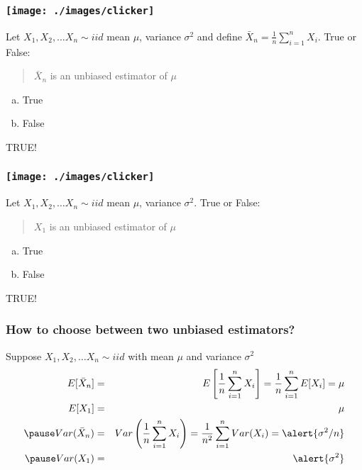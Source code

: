 \documentclass[handout]{beamer}
\begin{document}
\begin{frame}
\frametitle{\texttt{[image: ./images/clicker]}}
Let $X_1, X_2, \hdots X_n \sim iid$ mean $\mu$, variance $\sigma^2$ and define $\bar{X}_n = \frac{1}{n}\sum_{i=1}^n X_i$. True or False:

\vspace{1em}
\begin{quotation}
$\bar{X}_n$ is an unbiased estimator of $\mu$
\end{quotation}

\begin{enumerate}[(a)]
\item True
\item False
\end{enumerate}
\pause

\alert{TRUE!}

\end{frame}

\begin{frame}
\frametitle{\texttt{[image: ./images/clicker]}}
Let $X_1, X_2, \hdots X_n \sim iid$ mean $\mu$, variance $\sigma^2$. True or False:

\vspace{1em}
\begin{quotation}
$X_1$ is an unbiased estimator of $\mu$
\end{quotation}

\begin{enumerate}[(a)]
\item True
\item False
\end{enumerate}

\pause \alert{TRUE!}
\end{frame}
\begin{frame}
\frametitle{How to choose between two unbiased estimators?}

Suppose $X_1, X_2, \hdots X_n \sim iid$ with mean $\mu$ and variance $\sigma^2$
\begin{eqnarray*}
E[\bar{X}_n] &=& E\left[\frac{1}{n}\sum_{i=1}^n X_i\right] = \frac{1}{n}\sum_{i=1}^n E[X_i] = \mu\\
E[X_1] &=& \mu\\
\pause
Var(\bar{X}_n) &=& Var\left(\frac{1}{n}\sum_{i=1}^n X_i\right) = \frac{1}{n^2} \sum_{i=1}^n Var(X_i) = \alert{\sigma^2/n}\\
\pause
Var(X_1) &=& \alert{\sigma^2}
\end{eqnarray*}
\end{frame}
\end{document}
